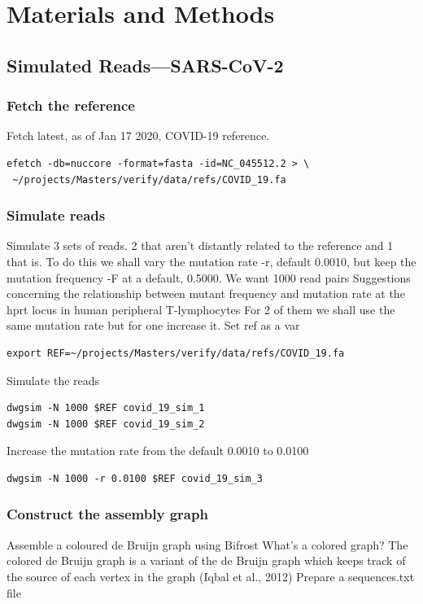 \documentclass[10pt, a4paper]{article}
\begin{document}

\section{Materials and Methods}
\label{sec:orgad6fc4c}
\subsection{Simulated Reads—SARS-CoV-2}
\label{sec:org3f14fee}
\subsubsection{Fetch the reference}
\label{sec:org51271c0}
Fetch latest, as of Jan 17 2020, COVID-19 reference.

\begin{verbatim}
efetch -db=nuccore -format=fasta -id=NC_045512.2 > \
 ~/projects/Masters/verify/data/refs/COVID_19.fa
\end{verbatim}

\subsubsection{Simulate reads}
\label{sec:org76b2cac}
Simulate 3 sets of reads. 2 that aren’t distantly related to the reference and 1 that is.
To do this we shall vary the mutation rate -r, default 0.0010, but keep the mutation frequency -F at a default, 0.5000. We want 1000 read pairs
Suggestions concerning the relationship between mutant frequency and mutation rate at the hprt locus in human peripheral T-lymphocytes
For 2 of them we shall use the same mutation rate but for one increase it.
Set ref as a var


\begin{verbatim}
export REF=~/projects/Masters/verify/data/refs/COVID_19.fa
\end{verbatim}

Simulate the reads
\begin{verbatim}
dwgsim -N 1000 $REF covid_19_sim_1
dwgsim -N 1000 $REF covid_19_sim_2
\end{verbatim}

Increase the mutation rate from the default 0.0010 to 0.0100

\begin{verbatim}
dwgsim -N 1000 -r 0.0100 $REF covid_19_sim_3
\end{verbatim}

\subsubsection{Construct the assembly graph}
\label{sec:org10a36de}
Assemble a coloured de Bruijn graph using Bifrost
What’s a colored graph? The colored de Bruijn graph is a variant of the de Bruijn graph which keeps track of the source of each vertex in the graph (Iqbal et al., 2012)
Prepare a sequences.txt file
\end{document}
